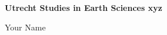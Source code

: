 \begin{titlepage}
    \begin{addmargin}[-1cm]{-3cm}
        {\noindent\bfseries\large{Utrecht Studies in Earth Sciences xyz}\par}
        \bigskip
        \bigskip
        \bigskip
        \bigskip
        \bigskip
        {\noindent\raggedright\color{CTtitle}\bfseries\spacedallcaps{\myTitle}\par}
        \bigskip
        \bigskip
        \noindent Your Name
        \vfill
    \end{addmargin}
\end{titlepage}
